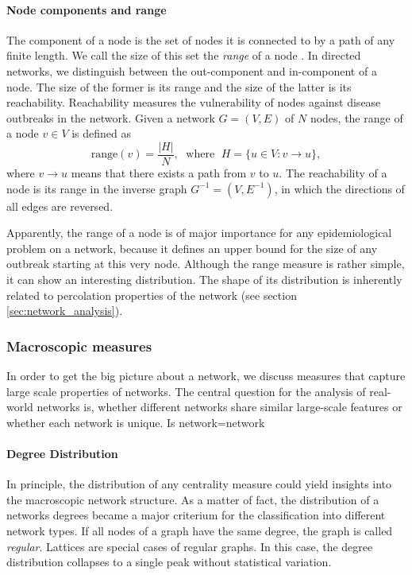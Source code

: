 \paragraph{Node components and range\color{Cayenne}{.}}
The component of a node is the set of nodes it is connected to by a path of any finite length.
We call the size of this set the \emph{range} of a node \citep{Lentz:2012pre}.
In directed networks, we distinguish between the out-component and in-component of a node.
The size of the former is its range and the size of the latter is its reachability.
Reachability measures the vulnerability of nodes against disease outbreaks in the network.
Given a network $G=(V,E)$ of $N$ nodes, the range of a node $v \in V$ is defined as
\begin{equation}\label{eq:range_def}
\mathrm{range}(v)=\frac{\left| H \right| }{N}, \; \text{ where } \; H=\{u \in V: v\rightarrow u \},
\end{equation}
where $ v\rightarrow u $ means that there exists a path from $v$ to $u$.
The reachability of a node is its range in the inverse graph $G^{-1}=(V,E^{-1})$, in which the directions of all edges are reversed. 

Apparently, the range of a node is of major importance for any epidemiological problem on a network, because it defines an upper bound for the size of any outbreak starting at this very node. 
Although the range measure is rather simple, it can show an interesting distribution.
The shape of its distribution is inherently related to percolation properties of the network (see section \ref{sec:network_analysis}).


\subsubsection{Macroscopic measures}\label{sec:macro_measures}
In order to get the big picture about a network, we discuss measures that capture large scale properties of networks.
The central question for the analysis of real-world networks is, whether different networks share similar large-scale features or whether each network is unique.
Is network=network\textbf{\textsf{\color{Cayenne}{?}}}

\paragraph{Degree Distribution\color{Cayenne}{.}}
In principle, the distribution of any centrality measure could yield insights into the macroscopic network structure.
As a matter of fact, the distribution of a networks degrees became a major criterium for the classification into different network types.
If all nodes of a graph have the same degree, the graph is called \emph{regular}.
Lattices are special cases of regular graphs.
In this case, the degree distribution collapses to a single peak without statistical variation.

